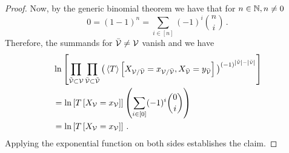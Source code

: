 \begin{proof}
	Now, by the generic binomial theorem we have that for $n\in\mathbb{N}, n \neq 0$
		\[ 0 = (1-1)^n = \sum_{i \in [n]}  (-1)^{i}  \binom{n}{i}   \, . \]
	Therefore, the summands for $\bar{\mathcal{V}}\neq\mathcal{V}$ vanish and we have
	\begin{align*}
			& \ln \left[  \prod_{\tilde{\mathcal{V}}\subset\mathcal{V}} \prod_{\bar{\mathcal{V}}\subset\tilde{\mathcal{V}}}
			\big(\left\langle T\right\rangle \left[ X_{\mathcal{V}/\bar{\mathcal{V}}}=x_{\mathcal{V}/\bar{\mathcal{V}}}, X_{\bar{\mathcal{V}}} = y_{\bar{\mathcal{V}}} \right]\big)^{(-1)^{\left|\tilde{\mathcal{V}}\right|-\left|\bar{\mathcal{V}}\right|}}  \right] \\
			& = \ln \left[ T\left[X_{\mathcal{V}}=x_{\mathcal{V}}\right] \right]
			\left( \sum_{i \in [0]}  (-1)^{i}  \binom{0}{i}  \right) \\
			& = \ln \left[ T\left[X_{\mathcal{V}}=x_{\mathcal{V}}\right] \right] \, .
	\end{align*}
	Applying the exponential function on both sides establishes the claim.
\end{proof}

